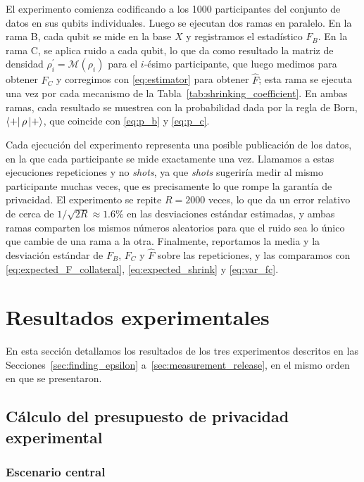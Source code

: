 \documentclass{ieeeaccess}
\begin{document}
El experimento comienza codificando a los 1000 participantes del conjunto de datos en sus qubits individuales. Luego se ejecutan dos ramas en paralelo. En la rama B, cada qubit se mide en la base $X$ y registramos el estadístico $F_B$. En la rama C, se aplica ruido a cada qubit, lo que da como resultado la matriz de densidad $\rho_i^{\prime} = \mathcal{M}(\rho_i)$ para el $i$-ésimo participante, que luego medimos para obtener $F_C$ y corregimos con \eqref{eq:estimator} para obtener $\hat{F}$; esta rama se ejecuta una vez por cada mecanismo de la Tabla~\ref{tab:shrinking_coefficient}. En ambas ramas, cada resultado se muestrea con la probabilidad dada por la regla de Born, $\bra{+}\rho\ket{+}$, que coincide con \eqref{eq:p_b} y \eqref{eq:p_c}.

Cada ejecución del experimento representa una posible publicación de los datos, en la que cada participante se mide exactamente una vez. Llamamos a estas ejecuciones repeticiones y no \textit{shots}, ya que \textit{shots} sugeriría medir al mismo participante muchas veces, que es precisamente lo que rompe la garantía de privacidad. El experimento se repite $R = 2000$ veces, lo que da un error relativo de cerca de $1/\sqrt{2R} \approx 1.6\%$ en las desviaciones estándar estimadas, y ambas ramas comparten los mismos números aleatorios para que el ruido sea lo único que cambie de una rama a la otra. Finalmente, reportamos la media y la desviación estándar de $F_B$, $F_C$ y $\hat{F}$ sobre las repeticiones, y las comparamos con \eqref{eq:expected_F_collateral}, \eqref{eq:expected_shrink} y \eqref{eq:var_fc}.

\section{Resultados experimentales}
\label{sec:experimental_results}

En esta sección detallamos los resultados de los tres experimentos descritos en las Secciones~\ref{sec:finding_epsilon} a~\ref{sec:measurement_release}, en el mismo orden en que se presentaron.

\subsection{Cálculo del presupuesto de privacidad experimental}

\subsubsection{Escenario central}
\end{document}
